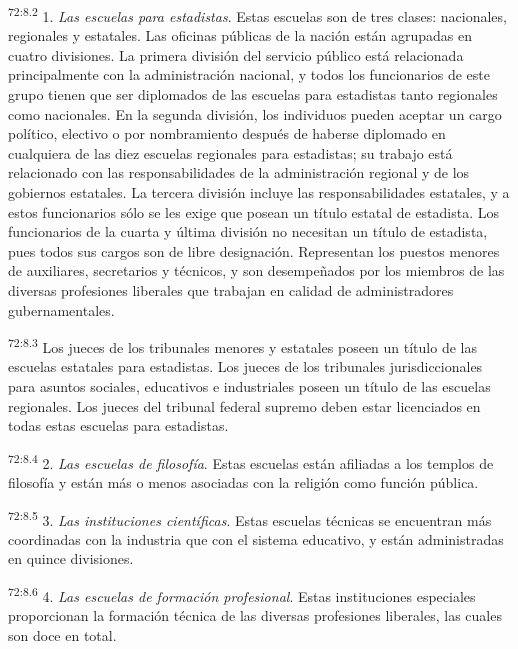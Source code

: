 \par
\textsuperscript{72:8.2} 1. \textit{Las escuelas para estadistas}. Estas escuelas son de tres clases: nacionales, regionales y estatales. Las oficinas públicas de la nación están agrupadas en cuatro divisiones. La primera división del servicio público está relacionada principalmente con la administración nacional, y todos los funcionarios de este grupo tienen que ser diplomados de las escuelas para estadistas tanto regionales como nacionales. En la segunda división, los individuos pueden aceptar un cargo político, electivo o por nombramiento después de haberse diplomado en cualquiera de las diez escuelas regionales para estadistas; su trabajo está relacionado con las responsabilidades de la administración regional y de los gobiernos estatales. La tercera división incluye las responsabilidades estatales, y a estos funcionarios sólo se les exige que posean un título estatal de estadista. Los funcionarios de la cuarta y última división no necesitan un título de estadista, pues todos sus cargos son de libre designación. Representan los puestos menores de auxiliares, secretarios y técnicos, y son desempeñados por los miembros de las diversas profesiones liberales que trabajan en calidad de administradores gubernamentales.

\par
\textsuperscript{72:8.3} Los jueces de los tribunales menores y estatales poseen un título de las escuelas estatales para estadistas. Los jueces de los tribunales jurisdiccionales para asuntos sociales, educativos e industriales poseen un título de las escuelas regionales. Los jueces del tribunal federal supremo deben estar licenciados en todas estas escuelas para estadistas.

\par
\textsuperscript{72:8.4} 2. \textit{Las escuelas de filosofía}. Estas escuelas están afiliadas a los templos de filosofía y están más o menos asociadas con la religión como función pública.

\par
\textsuperscript{72:8.5} 3. \textit{Las instituciones científicas}. Estas escuelas técnicas se encuentran más coordinadas con la industria que con el sistema educativo, y están administradas en quince divisiones.

\par
\textsuperscript{72:8.6} 4. \textit{Las escuelas de formación profesional}. Estas instituciones especiales proporcionan la formación técnica de las diversas profesiones liberales, las cuales son doce en total.

